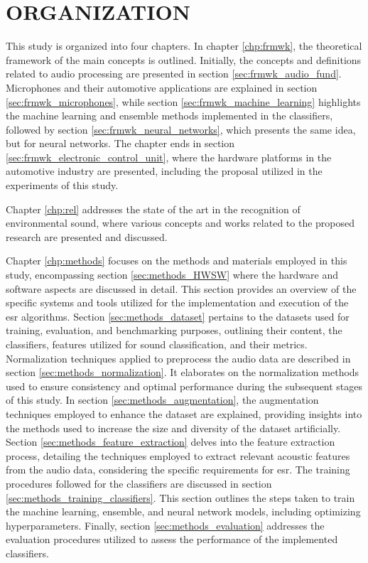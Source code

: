 \section{ORGANIZATION}
\label{sec:introduction_organization}

This study is organized into four chapters. In chapter \ref{chp:frmwk}, the theoretical framework of the main concepts is outlined. Initially, the concepts and definitions related to audio processing are presented in section \ref{sec:frmwk_audio_fund}. Microphones and their automotive applications are explained in section \ref{sec:frmwk_microphones}, while section \ref{sec:frmwk_machine_learning} highlights the machine learning and ensemble methods implemented in the classifiers, followed by section \ref{sec:frmwk_neural_networks}, which presents the same idea, but for neural networks. The chapter ends in section \ref{sec:frmwk_electronic_control_unit}, where the hardware platforms in the automotive industry are presented, including the proposal utilized in the experiments of this study.

Chapter \ref{chp:rel} addresses the state of the art in the recognition of environmental sound, where various concepts and works related to the proposed research are presented and discussed.

Chapter \ref{chp:methods} focuses on the methods and materials employed in this study, encompassing section \ref{sec:methods_HWSW} where the hardware and software aspects are discussed in detail. This section provides an overview of the specific systems and tools utilized for the implementation and execution of the \gls{esr} algorithms. Section \ref{sec:methods_dataset} pertains to the datasets used for training, evaluation, and benchmarking purposes, outlining their content, the classifiers, features utilized for sound classification, and their metrics. Normalization techniques applied to preprocess the audio data are described in section \ref{sec:methods_normalization}. It elaborates on the normalization methods used to ensure consistency and optimal performance during the subsequent stages of this study. In section \ref{sec:methods_augmentation}, the augmentation techniques employed to enhance the dataset are explained, providing insights into the methods used to increase the size and diversity of the dataset artificially. Section \ref{sec:methods_feature_extraction} delves into the feature extraction process, detailing the techniques employed to extract relevant acoustic features from the audio data, considering the specific requirements for \gls{esr}. The training procedures followed for the classifiers are discussed in section \ref{sec:methods_training_classifiers}. This section outlines the steps taken to train the machine learning, ensemble, and neural network models, including optimizing hyperparameters. Finally, section \ref{sec:methods_evaluation} addresses the evaluation procedures utilized to assess the performance of the implemented classifiers.

